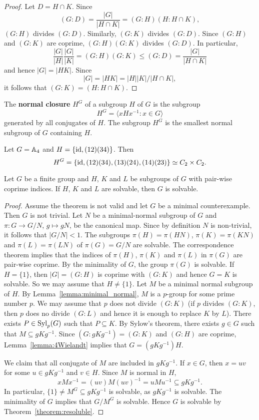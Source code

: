 \begin{proof}
	Let $D=H\cap K$. Since
	\[
	(G:D)=\frac{|G|}{|H\cap K|}=(G:H)(H:H\cap K),
	\]
	$(G:H)$ divides $(G:D)$. Similarly, $(G:K)$ divides 
	$(G:D)$. Since $(G:H)$ and $(G:K)$ are coprime, $(G:H)(G:K)$
	divides $(G:D)$. In particular, 
	\[
	\frac{|G|}{|H|}\frac{|G|}{|K|}=(G:H)(G:K)\leq (G:D)=\frac{|G|}{|H\cap K|}
	\]
	and hence $|G|=|HK|$. Since 
	\[
	|G|=|HK|=|H||K|/|H\cap K|, 
	\]
	it follows that 
	$(G:K)=(H:H\cap K)$.
\end{proof}

The 
\textbf{normal closure} $H^G$ of a subgroup $H$ of $G$ is the subgroup
\[
	H^G=\langle xHx^{-1}:x\in G\rangle
\]
generated by all conjugates of $H$. The 
subgroup $H^G$ is the smallest normal subgroup of $G$ containing $H$. 

\begin{example}
	Let $G=\mathbb{A}_4$ and $H=\{\operatorname{id},(12)(34)\}$. Then 
	\[
	H^G=\{\operatorname{id},(12)(34),(13)(24),(14)(23)\}\simeq C_2\times C_2.
	\]
\end{example}


\begin{theorem}[Wielandt]
	\label{theorem:Wielandt:solvable}
	Let $G$ be a finite group and $H$, $K$ and $L$ be subgroups of $G$ 
	with pair-wise coprime indices. If $H$, $K$ and $L$ are solvable, 
	then $G$ is solvable. 
\end{theorem}

\begin{proof}
	Assume the theorem is not valid and let $G$ be a minimal counterexample. 
	Then $G$ is not trivial.  
	Let $N$ be a minimal-normal subgroup of 
	$G$ and $\pi\colon G\to G/N$, $g\mapsto gN$, be the canonical map. Since 
	by definition $N$ is non-trivial, 
	it follows that $|G/N|<1$. 
	The subgroups 
	$\pi(H)=\pi(HN)$, $\pi(K)=\pi(KN)$ and $\pi(L)=\pi(LN)$ of $\pi(G)=G/N$ are solvable. 
	The correspondence theorem implies that 
	the indices of $\pi(H)$, $\pi(K)$ and $\pi(L)$ in $\pi(G)$ are pair-wise coprime. By the 
	minimality of $G$, the group 
	$\pi(G)$ is solvable. If $H=\{1\}$, then 
	$|G|=(G:H)$ is coprime with $(G:K)$ and hence $G=K$ is solvable. So we may assume that  
	$H\ne \{1\}$. Let $M$ be a minimal normal subgroup of $H$. By
	Lemma~\ref{lemma:minimal_normal}, $M$ is a $p$-group for some prime number $p$. We may
	assume that $p$ does not divide 
	$(G:K)$ (if $p$ divides $(G:K)$, then $p$ does no divide $(G:L)$ and 
	hence it is enough to replace $K$ by $L$). There exists 
	$P\in\mathrm{Syl}_p(G)$ such that $P\subseteq K$. By Sylow's theorem, 
	there exists  $g\in G$ such that $M\subseteq
	gKg^{-1}$. Since $(G:gKg^{-1})=(G:K)$ and $(G:H)$ are coprime, 
	Lemma~\ref{lemma:4Wielandt} implies that $G=(gKg^{-1})H$. 
	
	We claim that all conjugate of $M$ are included in $gKg^{-1}$. 
	If $x\in G$, then $x=uv$ for some $u\in 
	gKg^{-1}$ and $v\in H$. Since $M$ is normal in $H$, 
	\[
	xMx^{-1}=(uv)M(uv)^{-1}=uMu^{-1}\subseteq gKg^{-1}.
	\]
	In particular, $\{1\}\ne M^G\subseteq gKg^{-1}$ is solvable, as $gKg^{-1}$ is
	solvable. The minimality of $G$ implies that $G/M^G$ is solvable. Hence 
	$G$ is solvable by Theorem~\ref{theorem:resoluble}.
\end{proof}


